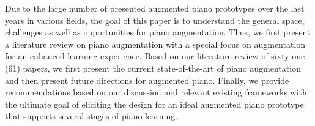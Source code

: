 \documentclass[sigconf, screen, review]{acmart}
\begin{document}
Due to the large number of presented augmented piano prototypes over the last years in various fields, the goal of this paper is to understand the general space, challenges as well as opportunities for piano augmentation. Thus, we first present a literature review on piano augmentation with a special focus on augmentation for an enhanced learning experience. Based on our literature review of sixty one (61) papers, we first present the current state-of-the-art of piano augmentation and then present future directions for augmented piano. Finally, we provide recommendations based on our discussion and relevant existing frameworks with the ultimate goal of eliciting the design for an ideal augmented piano prototype that supports several stages of piano learning.
\end{document}
